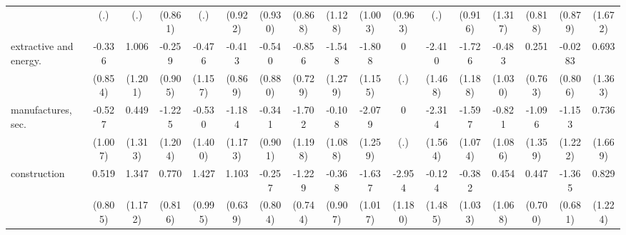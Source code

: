 {\begin{tabular}{l*{16}{c}}
                    &         (.)         &         (.)         &     (0.861)         &         (.)         &     (0.922)         &     (0.930)         &     (0.868)         &     (1.128)         &     (1.003)         &     (0.963)         &         (.)         &     (0.916)         &     (1.317)         &     (0.818)         &     (0.879)         &     (1.672)         \\
[1em]
extractive and energy.&      -0.336         &       1.006         &      -0.259         &      -0.476         &      -0.413         &      -0.540         &      -0.856         &      -1.548         &      -1.808         &           0         &      -2.410         &      -1.726         &      -0.483         &       0.251         &     -0.0283         &       0.693         \\
                    &     (0.854)         &     (1.201)         &     (0.905)         &     (1.157)         &     (0.869)         &     (0.880)         &     (0.729)         &     (1.279)         &     (1.155)         &         (.)         &     (1.468)         &     (1.188)         &     (1.030)         &     (0.763)         &     (0.806)         &     (1.363)         \\
[1em]
manufactures, sec.  &      -0.527         &       0.449         &      -1.225         &      -0.530         &      -1.184         &      -0.341         &      -1.702         &      -0.108         &      -2.079         &           0         &      -2.314         &      -1.597         &      -0.821         &      -1.096         &      -1.153         &       0.736         \\
                    &     (1.007)         &     (1.313)         &     (1.204)         &     (1.400)         &     (1.173)         &     (0.901)         &     (1.198)         &     (1.088)         &     (1.259)         &         (.)         &     (1.564)         &     (1.074)         &     (1.086)         &     (1.359)         &     (1.222)         &     (1.669)         \\
[1em]
construction        &       0.519         &       1.347         &       0.770         &       1.427         &       1.103         &      -0.257         &      -1.229         &      -0.368         &      -1.637         &      -2.954\sym{*}  &      -0.124         &      -0.382         &       0.454         &       0.447         &      -1.365\sym{*}  &       0.829         \\
                    &     (0.805)         &     (1.172)         &     (0.816)         &     (0.995)         &     (0.639)         &     (0.804)         &     (0.744)         &     (0.907)         &     (1.017)         &     (1.180)         &     (1.485)         &     (1.033)         &     (1.068)         &     (0.700)         &     (0.681)         &     (1.224)         \\

\end{tabular}}

